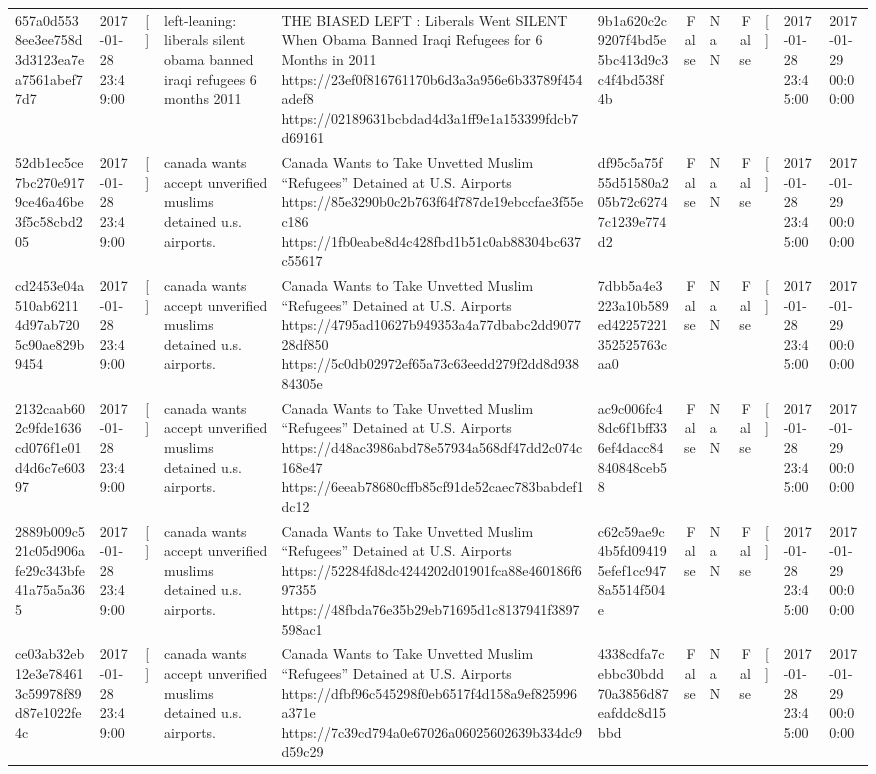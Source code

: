 \begin{tabular}{llllllrlrlll}
657a0d5538ee3ee758d3d3123ea7ea7561abef77d7 & 2017-01-28 23:49:00 & [] & left-leaning: liberals silent obama banned iraqi refugees 6 months 2011 & THE BIASED LEFT : Liberals Went SILENT When Obama Banned Iraqi Refugees for 6 Months in 2011 https://23ef0f816761170b6d3a3a956e6b33789f454adef8 https://02189631bcbdad4d3a1ff9e1a153399fdcb7d69161 & 9b1a620c2c9207f4bd5e5bc413d9c3c4f4bd538f4b & False & NaN & False & [] & 2017-01-28 23:45:00 & 2017-01-29 00:00:00 \\
52db1ec5ce7bc270e9179ce46a46be3f5c58cbd205 & 2017-01-28 23:49:00 & [] & canada wants accept unverified muslims detained u.s. airports. & Canada Wants to Take Unvetted Muslim “Refugees” Detained at U.S. Airports https://85e3290b0c2b763f64f787de19ebccfae3f55ec186 https://1fb0eabe8d4c428fbd1b51c0ab88304bc637c55617 & df95c5a75f55d51580a205b72c62747c1239e774d2 & False & NaN & False & [] & 2017-01-28 23:45:00 & 2017-01-29 00:00:00 \\
cd2453e04a510ab62114d97ab7205c90ae829b9454 & 2017-01-28 23:49:00 & [] & canada wants accept unverified muslims detained u.s. airports. & Canada Wants to Take Unvetted Muslim “Refugees” Detained at U.S. Airports https://4795ad10627b949353a4a77dbabc2dd907728df850 https://5c0db02972ef65a73c63eedd279f2dd8d93884305e & 7dbb5a4e3223a10b589ed42257221352525763caa0 & False & NaN & False & [] & 2017-01-28 23:45:00 & 2017-01-29 00:00:00 \\
2132caab602c9fde1636cd076f1e01d4d6c7e60397 & 2017-01-28 23:49:00 & [] & canada wants accept unverified muslims detained u.s. airports. & Canada Wants to Take Unvetted Muslim “Refugees” Detained at U.S. Airports https://d48ac3986abd78e57934a568df47dd2c074c168e47 https://6eeab78680cffb85cf91de52caec783babdef1dc12 & ac9c006fc48dc6f1bff336ef4dacc84840848ceb58 & False & NaN & False & [] & 2017-01-28 23:45:00 & 2017-01-29 00:00:00 \\
2889b009c521c05d906afe29c343bfe41a75a5a365 & 2017-01-28 23:49:00 & [] & canada wants accept unverified muslims detained u.s. airports. & Canada Wants to Take Unvetted Muslim “Refugees” Detained at U.S. Airports https://52284fd8dc4244202d01901fca88e460186f697355 https://48fbda76e35b29eb71695d1c8137941f3897598ac1 & c62c59ae9c4b5fd094195efef1cc9478a5514f504e & False & NaN & False & [] & 2017-01-28 23:45:00 & 2017-01-29 00:00:00 \\
ce03ab32eb12e3e784613c59978f89d87e1022fe4c & 2017-01-28 23:49:00 & [] & canada wants accept unverified muslims detained u.s. airports. & Canada Wants to Take Unvetted Muslim “Refugees” Detained at U.S. Airports https://dfbf96c545298f0eb6517f4d158a9ef825996a371e https://7c39cd794a0e67026a06025602639b334dc9d59c29 & 4338cdfa7cebbc30bdd70a3856d87eafddc8d15bbd & False & NaN & False & [] & 2017-01-28 23:45:00 & 2017-01-29 00:00:00 \\

\end{tabular}
